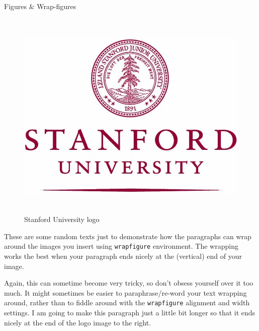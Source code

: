 \documentclass[final]{beamer}
\newlength{\secondcolwid}
\begin{document}
\begin{frame}[t]
\begin{columns}[t]
\begin{column}[t]{\secondcolwid}
\begin{block}{Figures \& Wrap-figures}
    	\begin{figure}
        	\vspace{0.5cm}
        	\includegraphics[height=4in]{./img/logo.jpg}
            \caption{Stanford University logo \cite{StanfordLogo}
            }
            \label{fig:stanford_logo}
        \end{figure}

		These are some random texts just to demonstrate how the paragraphs can wrap around the images you insert using \texttt{wrapfigure} environment. The wrapping works the best when your paragraph ends nicely at the (vertical) end of your image.
		
		Again, this can sometime become very tricky, so don't obsess yourself over it too much. It might sometimes be easier to paraphrase/re-word your text wrapping around, rather than to fiddle around with the \texttt{wrapfigure} alignment and width settings. I am going to make this paragraph just a little bit longer so that it ends nicely at the end of the logo image to the right.
        

\end{block}
\end{column}
\end{columns}
\end{frame}
\end{document}
